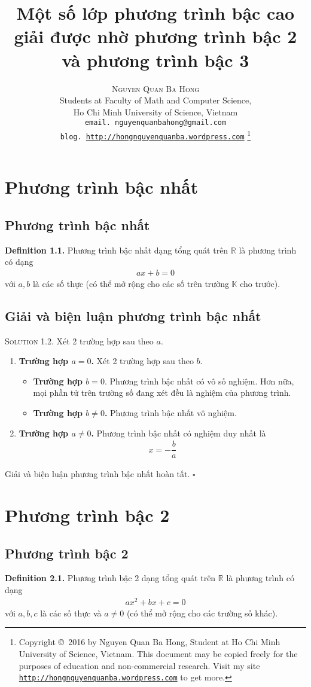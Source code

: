 \documentclass[a4paper,oneside]{book}
\title{Một số lớp phương trình bậc cao giải được nhờ phương trình bậc 2 và phương trình bậc 3}
\author{\textsc{Nguyen Quan Ba Hong}\\
{\small Students at Faculty of Math and Computer Science,}\\ 
{\small Ho Chi Minh University of Science, Vietnam} \\
{\small \texttt{email. nguyenquanbahong@gmail.com}}\\
{\small \texttt{blog. \url{http://hongnguyenquanba.wordpress.com}} 
\footnote{Copyright \copyright\ 2016 by Nguyen Quan Ba Hong, Student at Ho Chi Minh University of Science, Vietnam. This document may be copied freely for the purposes of education and non-commercial research. Visit my site \texttt{\url{http://hongnguyenquanba.wordpress.com}} to get more.}}}
\numberwithin{equation}{chapter}
\begin{document}
\frontmatter
\maketitle
\mainmatter
\tableofcontents
\chapter{Phương trình bậc nhất}
\section{Phương trình bậc nhất}
\textbf{Definition 1.1.} Phương trình bậc nhất dạng tổng quát trên $\mathbb{R}$ là phương trình có dạng
\begin{align}
ax + b = 0
\end{align}
với $a,b$ là các số thực (có thể mở rộng cho các số trên trường $\mathbb{K}$ cho trước).
\section{Giải và biện luận phương trình bậc nhất}
\textsc{Solution 1.2.} Xét 2 trường hợp sau theo $a$.
\begin{enumerate}
\item \textbf{Trường hợp $a = 0$.} Xét 2 trường hợp sau theo $b$.
\begin{itemize}
\item \textbf{Trường hợp $b = 0$}. Phương trình bậc nhất có vô số nghiệm. Hơn nữa, mọi phần tử trên trường số đang xét đều là nghiệm của phương trình.
\item \textbf{Trường hợp $b \ne 0$.} Phương trình bậc nhất vô nghiệm.
\end{itemize}
\item \textbf{Trường hợp $a \ne 0$.} Phương trình bậc nhất có nghiệm duy nhất là 
\begin{align}
x =  - \dfrac{b}{a}
\end{align}
\end{enumerate}
Giải và biện luận phương trình bậc nhất hoàn tất. \hfill $\square$
\chapter{Phương trình bậc 2}
\section{Phương trình bậc 2}
\textbf{Definition 2.1.} Phương trình bậc 2 dạng tổng quát trên $\mathbb{R}$ là phương trình có dạng
\begin{align}
a{x^2} + bx + c = 0
\end{align}
với $a, b, c$ là các số thực và $a \ne 0$ (có thể mở rộng cho các trường số khác).
\end{document}
